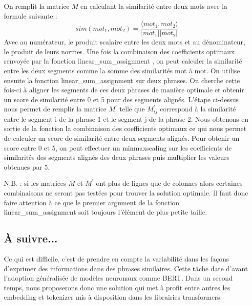 \documentclass[a4paper, twoside, 11pt]{article}
\begin{document}
 On remplit la matrice $M$ en calculant la similarité entre deux mots avec la formule suivante :
 \begin{equation}
    sim(mot_{1}, mot_{2})=\frac{\langle mot_{1}, mot_{2}\rangle}{|mot_{1}||mot_{2}|}
 \end{equation}
 Avec au numérateur, le produit scalaire entre les deux mots et au dénominateur, le produit de leurs normes. Une fois la combinaison des coefficients optimaux renvoyée par la fonction \og linear\_sum\_assignment \fg{}, on peut calculer la similarité entre les deux segments comme la somme des similarités mot à mot. On utilise ensuite la fonction \og linear\_sum\_assignment \fg{} sur deux phrases. On cherche cette fois-ci à aligner les segments de ces deux phrases de manière optimale et obtenir un score de similarité entre 0 et 5 pour des segments alignés. L’étape ci-dessus nous permet de remplir la matrice $M^{\prime}$ telle que $M^{\prime}_{ij}$ correspond à la similarité entre le segment i de la phrase 1 et le segment j de la phrase 2. Nous obtenons en sortie de la fonction la combinaison des coefficients optimaux ce qui nous permet de calculer un score de similarité entre deux segments alignés. Pour obtenir un score entre 0 et 5, on peut effectuer un \og minmaxscaling \fg{} sur les coefficients de similarités des segments alignés des deux phrases puis multiplier les valeurs obtenues par 5.

N.B. : si les matrices $M$ et $M^{\prime}$ ont plus de lignes que de colonnes alors certaines combinaisons ne seront pas testées pour trouver la solution optimale.
Il faut donc faire attention à ce que le premier argument de la fonction \og linear\_sum\_assignment \fg{} soit toujours l’élément de plus petite taille.

    \subsection{À suivre...}
     Ce qui est difficile, c’est de prendre en compte la variabilité dans les façons d’exprimer des informations dans des phrases similaires. Cette tâche date d’avant l’adoption généralisée de modèles neuronaux comme BERT. Dans un second temps, nous proposerons donc une solution qui met à profit entre autres les embedding et tokenizer mis à disposition dans les librairies transformers.

    \printbibliography
\end{document}
